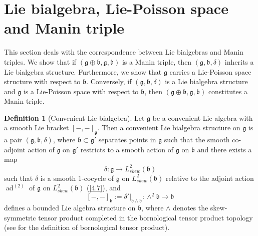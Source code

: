 \documentclass[11pt,reqno]{amsart}
\theoremstyle{definition}
\newtheorem{definition}[theorem]{Definition}
\numberwithin{equation}{section}
\begin{document}
\section{Lie bialgebra, Lie-Poisson space and Manin triple}\label{4}
This section deals with the correspondence between Lie bialgebras and Manin triples. We show that if  $(\mathfrak g\oplus\mathfrak b, \mathfrak{g}, \mathfrak{b})$ is  a Manin triple, then $(\mathfrak{g}, \mathfrak{b}, \delta)$ inherits a Lie bialgebra structure. Furthermore, we show that $\mathfrak{g}$ carries a Lie-Poisson space structure with respect to $\mathfrak{b}$. Conversely, if $(\mathfrak{g}, \mathfrak{b}, \delta)$ is a Lie bialgebra structure and $\mathfrak{g}$ is a Lie-Poisson space with respect to $\mathfrak{b}$, then $(\mathfrak{g}\oplus\mathfrak b, \mathfrak{g}, \mathfrak{b})$ constitutes a Manin triple.
\begin{definition}[Convenient Lie bialgebra]
Let $\mathfrak{g}$ be a convenient Lie algebra with a smooth Lie bracket $[-,-]_{\mathfrak{g}}$. Then a convenient Lie bialgebra structure on $\mathfrak{g}$ is a pair $(\mathfrak{g}, \mathfrak{b}, \delta)$, where $\mathfrak{b} \subset \mathfrak{g}'$ separates points in  $\mathfrak{g}$ such that the smooth co-adjoint action of $\mathfrak{g}$ on $\mathfrak{g}'$ restricts to a smooth action of $\mathfrak{g}$ on $\mathfrak{b}$ and there exists a map
\[
\delta : \mathfrak{g} \rightarrow L^2_{skew}(\mathfrak{b})
\]
such that $\delta$ is a smooth $1$-cocycle of $\mathfrak{g}$ on $L^2_{skew}(\mathfrak{b})$ relative to the adjoint action $\operatorname{ad}^{(2)}$ of $\mathfrak{g}$ on $L^2_{skew}(\mathfrak{b})$ (\ref{4.7}), and
\[
[-, -]_{\mathfrak{b}} := \delta'|_{\mathfrak b \wedge\mathfrak b} : \wedge^2\mathfrak{b} \rightarrow \mathfrak{b}
\]
defines a bounded Lie algebra structure on $\mathfrak{b}$, where $\wedge$ denotes the skew-symmetric tensor product completed in the bornological tensor product topology (see \cite[5.6]{20} for the definition of bornological tensor product). 
\end{definition}
\end{document}
